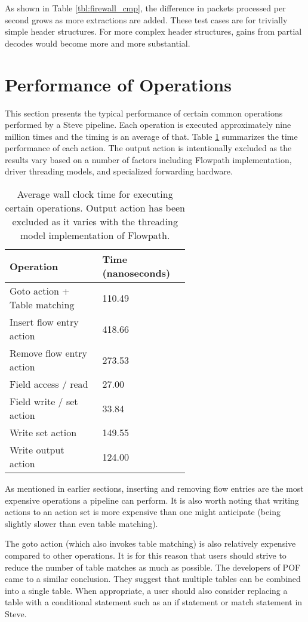 As shown in Table \ref{tbl:firewall_cmp}, the difference in packets processed per second grows as more extractions are added. These test cases are for trivially simple header structures. For more complex header structures, gains from partial decodes would become more and more substantial.


\section{Performance of Operations} \label{exp:action_performance}

This section presents the typical performance of certain common operations performed by a Steve pipeline. Each operation is executed approximately nine million times and the timing is an average of that. Table \ref{tbl:action_stats} summarizes the time performance of each action. The output action is intentionally excluded as the results vary based on a number of factors including Flowpath implementation, driver threading models, and specialized forwarding hardware.

\begin{table}
\caption{Average wall clock time for executing certain operations. Output action has been excluded as it varies with the threading model implementation of Flowpath.}
\begin{center}
\begin{tabular}{| p{0.4\linewidth} || p{0.2\linewidth} | }
\hline
Operation & Time (nanoseconds)  \\
\hline
Goto action + Table matching & 110.49 \\
\hline
Insert flow entry action & 418.66 \\
\hline
Remove flow entry action & 273.53 \\
\hline
Field access / read & 27.00 \\
\hline
Field write / set action & 33.84 \\
\hline
Write set action &  149.55 \\
\hline
Write output action & 124.00 \\
\hline
\end{tabular}
\end{center}
\label{tbl:action_stats}
\end{table}

As mentioned in earlier sections, inserting and removing flow entries are the most expensive operations a pipeline can perform. It is also worth noting that writing actions to an action set is more expensive than one might anticipate (being slightly slower than even table matching).

The goto action (which also invokes table matching) is also relatively expensive compared to other operations. It is for this reason that users should strive to reduce the number of table matches as much as possible. The developers of POF \cite{pof_impl} came to a similar conclusion. They suggest that multiple tables can be combined into a single table. When appropriate, a user should also consider replacing a table with a conditional statement such as an if statement or match statement in Steve.